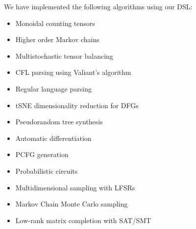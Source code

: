\documentclass[sigplan,10pt,review,anonymous]{acmart}
\begin{document}
We have implemented the following algorithms using our DSL:

\begin{itemize}
  \item Monoidal counting tensors
  \item Higher order Markov chains
  \item Multistochastic tensor balancing
  \item CFL parsing using Valiant's algorithm
  \item Regular language parsing
  \item tSNE dimensionality reduction for DFGs
  \item Pseudorandom tree synthesis
  \item Automatic differentiation
  \item PCFG generation
  \item Probabilistic circuits
  \item Multidimensional sampling with LFSRs
  \item Markov Chain Monte Carlo sampling
  \item Low-rank matrix completion with SAT/SMT
\end{itemize}



\end{document}
